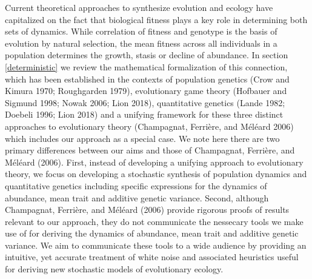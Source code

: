 \documentclass[]{article}
\begin{document}
Current theoretical approaches to synthesize evolution and ecology have
capitalized on the fact that biological fitness plays a key role in
determining both sets of dynamics. While correlation of fitness and
genotype is the basis of evolution by natural selection, the mean
fitness across all individuals in a population determines the growth,
stasis or decline of abundance. In section \ref{deterministic} we review
the mathematical formalization of this connection, which has been
established in the contexts of population genetics (Crow and Kimura
1970; Roughgarden 1979), evolutionary game theory (Hofbauer and Sigmund
1998; Nowak 2006; Lion 2018), quantitative genetics (Lande 1982; Doebeli
1996; Lion 2018) and a unifying framework for these three distinct
approaches to evolutionary theory (Champagnat, Ferrière, and Méléard
2006) which includes our approach as a special case. We note here there
are two primary differences between our aims and those of Champagnat,
Ferrière, and Méléard (2006). First, instead of developing a unifying
approach to evolutionary theory, we focus on developing a stochastic
synthesis of population dynamics and quantitative genetics including
specific expressions for the dynamics of abundance, mean trait and
additive genetic variance. Second, although Champagnat, Ferrière, and
Méléard (2006) provide rigorous proofs of results relevant to our
approach, they do not communicate the nessecary tools we make use of for
deriving the dynamics of abundance, mean trait and additive genetic
variance. We aim to communicate these tools to a wide audience by
providing an intuitive, yet accurate treatment of white noise and
associated heuristics useful for deriving new stochastic models of
evolutionary ecology.
\end{document}
